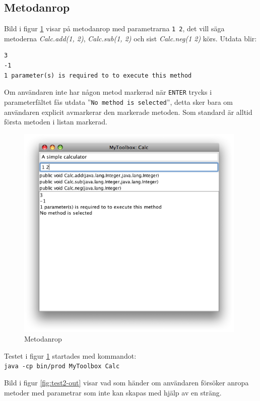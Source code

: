 \documentclass[a4paper, 12pt]{article}
\begin{document}
\newpage
\subsection{Metodanrop}
Bild i figur \ref{fig:test1-out} visar på metodanrop med parametrarna
\verb!1 2!, det vill säga metoderna \textit{Calc.add(1, 2)},
\textit{Calc.sub(1, 2)} och sist \textit{Calc.neg(1 2)} körs. Utdata
blir:

\begin{verbatim}
3
-1
1 parameter(s) is required to to execute this method
\end{verbatim}

Om användaren inte har någon metod markerad när \verb!ENTER! trycks i
parameterfältet fås utdata ''\verb!No method is selected!'', detta sker
bara om användaren explicit avmarkerar den markerade metoden. Som
standard är alltid första metoden i listan markerad.

\begin{figure}[H]
  \begin{center}
    \includegraphics[width=110mm]{images/test1-out.png}
    \caption{Metodanrop}
    \label{fig:test1-out}
  \end{center}
\end{figure}

Testet i figur \ref{fig:test1-out} startades med kommandot:\\
\verb!java -cp bin/prod MyToolbox Calc!

\newpage
Bild i figur \ref{fig:test2-out} visar vad som händer om användaren
försöker anropa metoder med parametrar som inte kan skapas med hjälp
av en sträng.
\end{document}
